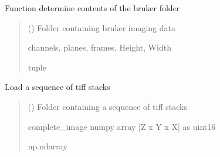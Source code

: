 \documentclass[letterpaper,10pt,english]{sphinxmanual}
\begin{document}
\begin{fulllineitems}
\label{\detokenize{CalSciPy.io:CalSciPy.io.determine_bruker_folder_contents}}
\pysigstartsignatures
{}
\pysigstopsignatures
\sphinxAtStartPar
Function determine contents of the bruker folder
\begin{quote}\begin{description}
\sphinxAtStartPar
{} (\sphinxstyleliteralemphasis{\sphinxupquote{{[}}}\sphinxstyleliteralemphasis{\sphinxupquote{, }}\sphinxstyleliteralemphasis{\sphinxupquote{{]}}}) \sphinxhyphen{}\sphinxhyphen{} Folder containing bruker imaging data

\sphinxAtStartPar
channels, planes, frames, Height, Width

\sphinxAtStartPar
tuple

\end{description}\end{quote}

\end{fulllineitems}


\begin{fulllineitems}
\label{\detokenize{CalSciPy.io:CalSciPy.io.load_all_tiffs}}
\pysigstartsignatures
{}
\pysigstopsignatures
\sphinxAtStartPar
Load a sequence of tiff stacks
\begin{quote}\begin{description}
\sphinxAtStartPar
{} (\sphinxstyleliteralemphasis{\sphinxupquote{{[}}}\sphinxstyleliteralemphasis{\sphinxupquote{, }}\sphinxstyleliteralemphasis{\sphinxupquote{{]}}}) \sphinxhyphen{}\sphinxhyphen{} Folder containing a sequence of tiff stacks

\sphinxAtStartPar
complete\_image numpy array {[}Z x Y x X{]} as uint16

\sphinxAtStartPar
np.ndarray

\end{description}\end{quote}

\end{fulllineitems}
\end{document}
